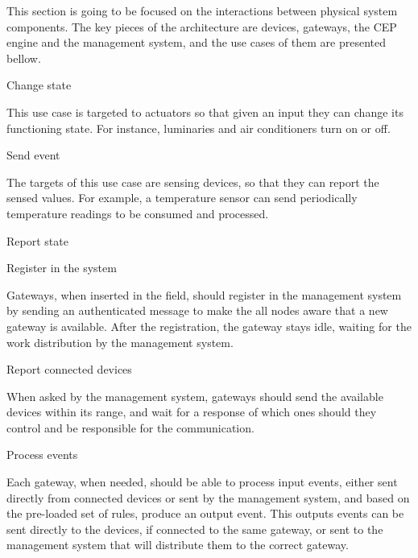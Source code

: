 This section is going to be focused on the interactions between physical system components. The key pieces of the architecture are  devices, gateways, the CEP engine and the management system, and the use cases of them are presented bellow.

\begin{Paragraph}{Change state} %
	
This use case is targeted to actuators so that given an input they can change its functioning state. For instance, luminaries and air conditioners turn on or off.
	
\end{Paragraph}

\begin{Paragraph}{Send event} %
	
The targets of this use case are sensing devices, so that they can report the sensed values. For example, a temperature sensor can send periodically temperature readings to be consumed and processed.
	
\end{Paragraph}

\begin{Paragraph}{Report state}
	

	
\end{Paragraph}

\begin{Paragraph}{Register in the system}
	
Gateways, when inserted in the field, should register in the management system by sending an authenticated message to make the all nodes aware that a new gateway is available. After the registration, the gateway stays idle, waiting for the work distribution by the management system.
	
\end{Paragraph}

\begin{Paragraph}{Report connected devices}
	
When asked by the management system, gateways should send the available devices within its range, and wait for a response of which ones should they control and be responsible for the communication. 
	
\end{Paragraph}

\begin{Paragraph}{Process events}
	
Each gateway, when needed, should be able to process input events, either sent directly from connected devices or sent by the management system, and based on the pre-loaded set of rules, produce an output event. This outputs events can be sent directly to the devices, if connected to the same gateway, or sent to the management system that will distribute them to the correct gateway.

\end{Paragraph}

